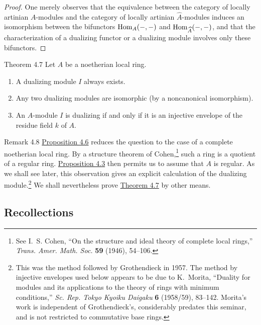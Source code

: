 \begin{proof}
One merely observes that the equivalence between the category of locally
artinian $A$-modules and the category of locally artinian
$\widehat A$-modules induces an isomorphism between the bifunctors
$\operatorname{Hom}_A(-,-)$ and $\operatorname{Hom}_{\widehat A}(-,-)$, and that the
characterization of a dualizing functor or a dualizing module involves only
these bifunctors.
\end{proof}

\begin{sgastatement}{Theorem 4.7}
Let $A$ be a noetherian local ring.
\begin{enumerate}[label=\textup{\alph*)},leftmargin=2.5em]
\item A dualizing module $I$ always exists.
\item Any two dualizing modules are isomorphic (by a noncanonical
isomorphism).
\item An $A$-module $I$ is dualizing if and only if it is an injective
envelope of the residue field $k$ of $A$.
\end{enumerate}
\end{sgastatement}

\begin{sgastatement}{Remark 4.8}
\hyperref[IV.4.6]{Proposition 4.6} reduces the question to the case of a complete noetherian
local ring. By a structure theorem of Cohen,\footnote{See I.~S. Cohen,
``On the structure and ideal theory of complete local rings,''
\emph{Trans. Amer. Math. Soc.} \textbf{59} (1946), 54--106.}
such a ring is a quotient of a regular ring. \hyperref[IV.4.3]{Proposition 4.3} then permits us
to assume that $A$ is regular. As we shall see later, this observation gives
an explicit calculation of the dualizing module.\footnote{This was the
method followed by Grothendieck in 1957. The method by injective envelopes
used below appears to be due to K.~Morita, ``Duality for modules and its
applications to the theory of rings with minimum conditions,''
  \emph{Sc. Rep. Tokyo Kyoiku Daigaku} \textbf{6} (1958/59), 83--142.
Morita's work is independent of Grothendieck's, considerably predates this
seminar, and is not restricted to commutative base rings.}
We shall nevertheless prove \hyperref[IV.4.7]{Theorem 4.7} by other means.
\end{sgastatement}

\subsection*{Recollections}

